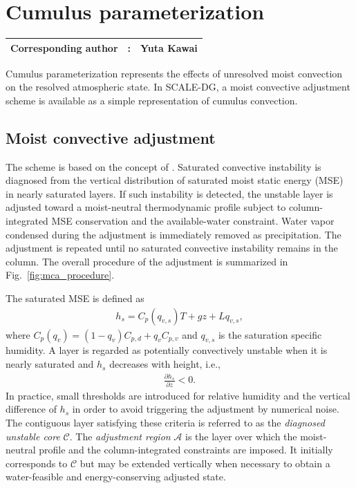 \section{Cumulus parameterization}
{\bf \Large
\begin{tabular}{ccc}
\hline
  Corresponding author & : & Yuta Kawai\\
\hline
\end{tabular}
}

Cumulus parameterization represents the effects of unresolved moist convection on the resolved atmospheric state.
In SCALE-DG, a moist convective adjustment scheme is available as a simple representation of cumulus convection.

\subsection{Moist convective adjustment}
\label{subsec:moist_convective_adjustment}
The scheme is based on the concept of \citet{manabe1965}.
Saturated convective instability is diagnosed from the vertical distribution of saturated moist static energy (MSE) in nearly saturated layers.
If such instability is detected, the unstable layer is adjusted toward a moist-neutral thermodynamic profile
subject to column-integrated MSE conservation and the available-water constraint.
Water vapor condensed during the adjustment is immediately removed as precipitation.
The adjustment is repeated until no saturated convective instability remains in the column.
The overall procedure of the adjustment is summarized in Fig.~\ref{fig:mca_procedure}.


The saturated MSE is defined as
%
\begin{align}
 h_s = C_{p}(q_{v,s}) T + gz + L q_{v,s},
\label{eq:mca_hsat}
\end{align}
%
where
$C_{p}(q_v) = (1-q_v) C_{p,d} + q_v C_{p,v}$
and $q_{v,s}$ is the saturation specific humidity.
A layer is regarded as potentially convectively unstable when it is nearly saturated and $h_s$ decreases with height, i.e.,
%
\begin{align}
 \frac{\partial h_s}{\partial z} < 0.
 \label{eq:mca_instability}
\end{align}
%
In practice, small thresholds are introduced for relative humidity and the vertical difference of $h_s$
in order to avoid triggering the adjustment by numerical noise.
The contiguous layer satisfying these criteria is referred to as the \textit{diagnosed unstable core} $\mathcal{C}$.
The \textit{adjustment region} $\mathcal{A}$ is the layer over which the moist-neutral profile and the column-integrated constraints are imposed.
It initially corresponds to $\mathcal{C}$ but may be extended vertically when necessary to obtain a water-feasible and energy-conserving adjusted state.

